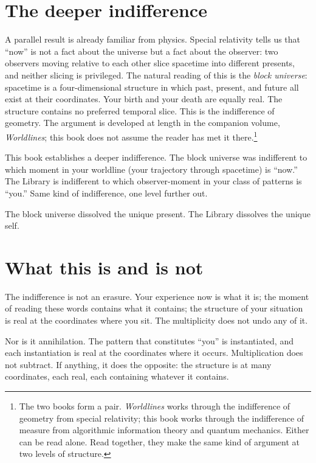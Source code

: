 \section*{The deeper indifference}

A parallel result is already familiar from physics. Special relativity tells us that ``now'' is not a fact about the universe but a fact about the observer: two observers moving relative to each other slice spacetime into different presents, and neither slicing is privileged. The natural reading of this is the \emph{block universe}: spacetime is a four-dimensional structure in which past, present, and future all exist at their coordinates. Your birth and your death are equally real. The structure contains no preferred temporal slice. This is the indifference of geometry. The argument is developed at length in the companion volume, \textit{Worldlines}; this book does not assume the reader has met it there.\footnote{The two books form a pair. \textit{Worldlines} works through the indifference of geometry from special relativity; this book works through the indifference of measure from algorithmic information theory and quantum mechanics. Either can be read alone. Read together, they make the same kind of argument at two levels of structure.}

This book establishes a deeper indifference. The block universe was indifferent to which moment in your worldline (your trajectory through spacetime) is ``now.'' The Library is indifferent to which observer-moment in your class of patterns is ``you.'' Same kind of indifference, one level further out.

The block universe dissolved the unique present. The Library dissolves the unique self.

\section*{What this is and is not}

The indifference is not an erasure. Your experience now is what it is; the moment of reading these words contains what it contains; the structure of your situation is real at the coordinates where you sit. The multiplicity does not undo any of it.

Nor is it annihilation. The pattern that constitutes ``you'' is instantiated, and each instantiation is real at the coordinates where it occurs. Multiplication does not subtract. If anything, it does the opposite: the structure is at many coordinates, each real, each containing whatever it contains.

